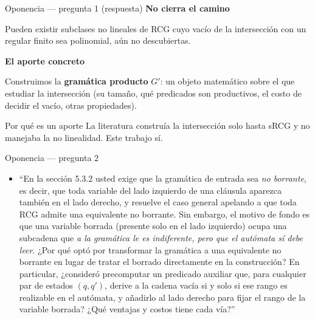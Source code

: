 \documentclass{beamer}
\begin{document}
\begin{frame}{Oponencia --- pregunta 1 (respuesta)}
  \textbf{No cierra el camino}

  Pueden existir subclases no lineales de RCG cuyo vacío de la intersección con un regular finito sea polinomial, aún no descubiertas.

  \pause
  \vspace{0.3cm}

  \textbf{El aporte concreto}

  Construimos la \textbf{gramática producto} $G'$: un objeto matemático sobre el que estudiar la intersección (su tamaño, qué predicados son productivos, el costo de decidir el vacío, otras propiedades).

  \pause

  \begin{block}{Por qué es un aporte}
    La literatura construía la intersección solo hasta sRCG y no manejaba la no linealidad. Este trabajo sí.
  \end{block}
\end{frame}

\begin{frame}{Oponencia --- pregunta 2}
  \footnotesize
  \begin{itemize}
    \item ``En la sección 5.3.2 usted exige que la gramática de entrada sea \emph{no borrante}, es decir, que toda variable del lado izquierdo de una cláusula aparezca también en el lado derecho, y resuelve el caso general apelando a que toda RCG admite una equivalente no borrante. Sin embargo, el motivo de fondo es que una variable borrada (presente solo en el lado izquierdo) ocupa una subcadena que \emph{a la gramática le es indiferente, pero que el autómata sí debe leer}. ¿Por qué optó por transformar la gramática a una equivalente no borrante en lugar de tratar el borrado directamente en la construcción? En particular, ¿consideró precomputar un predicado auxiliar que, para cualquier par de estados $(q, q')$, derive a la cadena vacía si y solo si ese rango es realizable en el autómata, y añadirlo al lado derecho para fijar el rango de la variable borrada? ¿Qué ventajas y costos tiene cada vía?''
  \end{itemize}
\end{frame}
\end{document}
